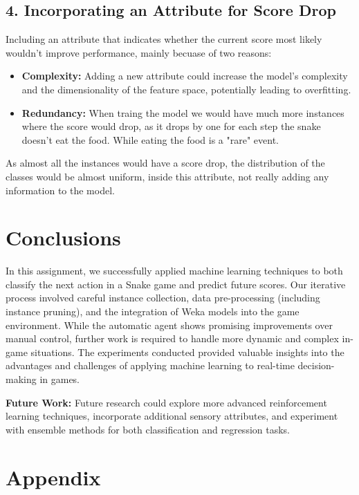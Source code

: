 \documentclass[12pt,a4paper]{article}
\begin{document}
\subsection*{4. Incorporating an Attribute for Score Drop}
Including an attribute that indicates whether the current score most likely  wouldn't improve performance, mainly becuase of two reasons:
\begin{itemize}
    \item \textbf{Complexity:} Adding a new attribute could increase the model's complexity and the dimensionality of the feature space, potentially leading to overfitting.
    \item \textbf{Redundancy:} When traing the model we would have much more instances where the score would drop, as it drops by one for each step the snake doesn't eat the food. While eating the food is a "rare" event.
\end{itemize}
As almost all the instances would have a score drop,
the distribution of the classes would be almost uniform, inside this attribute, not really adding any information to the model.





\section{Conclusions}
In this assignment, we successfully applied machine learning techniques to both classify the next action in a Snake game and predict future scores. Our iterative process involved careful instance collection, data pre-processing (including instance pruning), and the integration of Weka models into the game environment. While the automatic agent shows promising improvements over manual control, further work is required to handle more dynamic and complex in-game situations. The experiments conducted provided valuable insights into the advantages and challenges of applying machine learning to real-time decision-making in games.

\vspace{1em}
\noindent\textbf{Future Work:} Future research could explore more advanced reinforcement learning techniques, incorporate additional sensory attributes, and experiment with ensemble methods for both classification and regression tasks.


\newpage
\section{Appendix}
\end{document}
